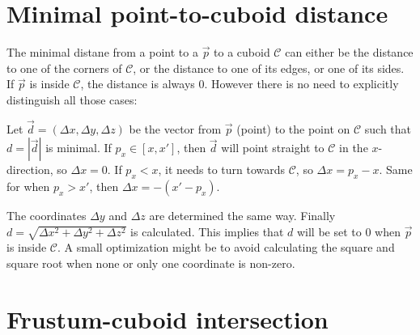 \documentclass[a4paper,10pt,abstracton,notitlepage]{scrreprt}
\begin{document}
\section{Minimal point-to-cuboid distance}
The minimal distane from a point to a $\overrightarrow{p}$ to a cuboid $\mathcal{C}$ can either be the distance to one of the corners of $\mathcal{C}$, or the distance to one of its edges, or one of its sides. If $\overrightarrow{p}$ is inside $\mathcal{C}$, the distance is always $0$. However there is no need to explicitly distinguish all those cases:

Let $\overrightarrow{d} = (\Delta x, \Delta y, \Delta z)$ be the vector from $\overrightarrow{p}$ (point) to the point on $\mathcal{C}$ such that $d = |\overrightarrow{d}|$ is minimal. If $p_{x} \in [x, x']$, then $\overrightarrow{d}$ will point straight to $\mathcal{C}$ in the $x$-direction, so $\Delta x = 0$. If $p_{x} < x$, it needs to turn towards $\mathcal{C}$, so $\Delta x = p_{x} - x$. Same for when $p_{x} > x'$, then $\Delta x = -(x' - p_{x})$.

The coordinates $\Delta y$ and $\Delta z$ are determined the same way. Finally $d = \sqrt{\Delta x^{2} + \Delta y^{2} + \Delta z^{2}}$ is calculated. This implies that $d$ will be set to $0$ when $\overrightarrow{p}$ is inside $\mathcal{C}$. A small optimization might be to avoid calculating the square and square root when none or only one coordinate is non-zero.

\section{Frustum-cuboid intersection}



\end{document}
